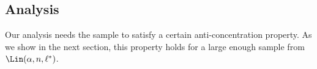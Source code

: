 \subsection{Analysis}

Our analysis needs the sample to satisfy a certain anti-concentration property. 
As we show in the next section, this property holds for a large enough sample from $\Lin(\alpha,n,\ell^*)$. %









